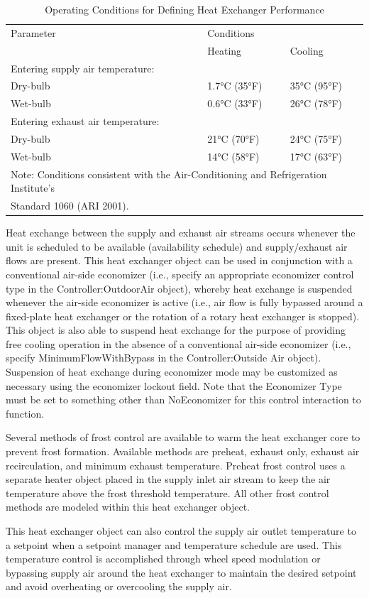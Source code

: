 \begin{longtable}[c]{p{3.0in}p{1.5in}p{1.5in}}
\caption{  Operating Conditions for Defining Heat Exchanger Performance \protect \label{table:operating-conditions-for-defining-heat}}\\
\toprule 
Parameter & Conditions \tabularnewline
 & Heating & Cooling \tabularnewline \midrule
\endhead
Entering supply air temperature: \tabularnewline
Dry-bulb & 1.7°C (35°F) & 35°C (95°F) \tabularnewline
Wet-bulb & 0.6°C (33°F) & 26°C (78°F) \tabularnewline
Entering exhaust air temperature: \tabularnewline
Dry-bulb & 21°C (70°F) & 24°C (75°F) \tabularnewline
Wet-bulb & 14°C (58°F) & 17°C (63°F) \tabularnewline
\multicolumn{3}{l}{Note: Conditions consistent with the Air-Conditioning and Refrigeration Institute’s}  \tabularnewline
\multicolumn{3}{l}{Standard 1060 (ARI 2001).} \tabularnewline
\bottomrule
\end{longtable}

Heat exchange between the supply and exhaust air streams occurs whenever the unit is scheduled to be available (availability schedule) and supply/exhaust air flows are present. This heat exchanger object can be used in conjunction with a conventional air-side economizer (i.e., specify an appropriate economizer control type in the Controller:OutdoorAir object), whereby heat exchange is suspended whenever the air-side economizer is active (i.e., air flow is fully bypassed around a fixed-plate heat exchanger or the rotation of a rotary heat exchanger is stopped). This object is also able to suspend heat exchange for the purpose of providing free cooling operation in the absence of a conventional air-side economizer (i.e., specify MinimumFlowWithBypass in the Controller:Outside Air object). Suspension of heat exchange during economizer mode may be customized as necessary using the economizer lockout field. Note that the Economizer Type must be set to something other than NoEconomizer for this control interaction to function.

Several methods of frost control are available to warm the heat exchanger core to prevent frost formation. Available methods are preheat, exhaust only, exhaust air recirculation, and minimum exhaust temperature. Preheat frost control uses a separate heater object placed in the supply inlet air stream to keep the air temperature above the frost threshold temperature. All other frost control methods are modeled within this heat exchanger object.

This heat exchanger object can also control the supply air outlet temperature to a setpoint when a setpoint manager and temperature schedule are used. This temperature control is accomplished through wheel speed modulation or bypassing supply air around the heat exchanger to maintain the desired setpoint and avoid overheating or overcooling the supply air.

